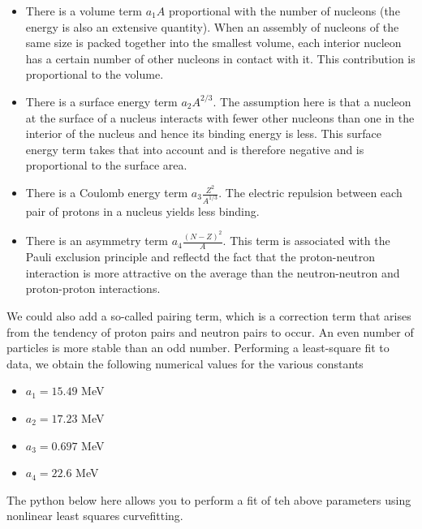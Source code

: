 \documentclass[%
oneside,                 %
final,                   %
10pt]{article}
\begin{document}
\begin{itemize}
 \item There is a volume term $a_1A$ proportional with the number of nucleons (the energy is also an extensive quantity). When an assembly of nucleons of the same size is packed together into the smallest volume, each interior nucleon has a certain number of other nucleons in contact with it. This contribution is proportional to the volume.

 \item There is a surface energy term $a_2A^{2/3}$. The assumption here is that a nucleon at the surface of a nucleus interacts with fewer other nucleons than one in the interior of the nucleus and hence its binding energy is less. This surface energy term takes that into account and is therefore negative and is proportional to the surface area.

 \item There is a Coulomb energy term $a_3\frac{Z^2}{A^{1/3}}$. The electric repulsion between each pair of protons in a nucleus yields less binding. 

 \item There is an asymmetry term $a_4\frac{(N-Z)^2}{A}$. This term is associated with the Pauli exclusion principle and reflectd the fact that the proton-neutron interaction is more attractive on the average than the neutron-neutron and proton-proton interactions.
\end{itemize}

\noindent
We could also add a so-called pairing term, which is a correction term that
arises from the tendency of proton pairs and neutron pairs to
occur. An even number of particles is more stable than an odd number. 
Performing a least-square fit to data, we obtain the following numerical values for the various constants
\begin{itemize}
\item $a_1=15.49$ MeV

\item $a_2=17.23$ MeV

\item $a_3=0.697$ MeV

\item $a_4=22.6$ MeV
\end{itemize}

\noindent
The python below here allows you to perform a fit of teh above parameters using nonlinear least squares curvefitting.
\end{document}
